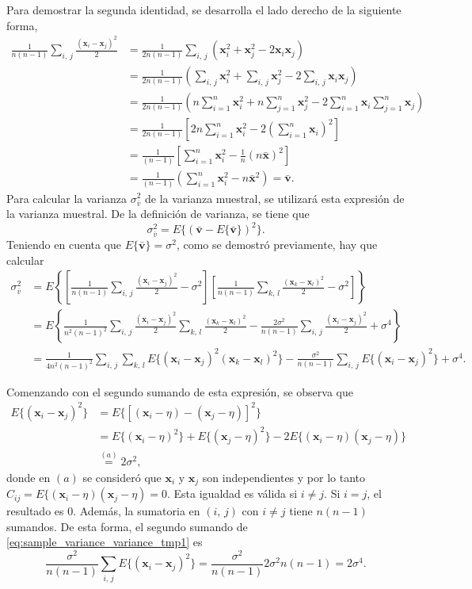 \documentclass[a4paper]{report}
\newcommand{\x}{\mathbf{x}}
\begin{document}
Para demostrar la segunda identidad, se desarrolla el lado derecho de la siguiente forma,
\begin{align*}
 \frac{1}{n(n-1)}\sum_{i,\,j}\frac{(\x_i-\x_j)^2}{2}&=\frac{1}{2n(n-1)}\sum_{i,\,j}(\x_i^2+\x_j^2-2\x_i\x_j)\\
 &=\frac{1}{2n(n-1)}\left(\sum_{i,\,j}\x_i^2+\sum_{i,\,j}\x_j^2-2\sum_{i,\,j}\x_i\x_j\right)\\
 &=\frac{1}{2n(n-1)}\left(n\sum_{i=1}^n\x_i^2+n\sum_{j=1}^n\x_j^2-2\sum_{i=1}^n\x_i\sum_{j=1}^n\x_j\right)\\
 &=\frac{1}{2n(n-1)}\left[2n\sum_{i=1}^n\x_i^2-2\left(\sum_{i=1}^n\x_i\right)^2\right]\\
 &=\frac{1}{(n-1)}\left[\sum_{i=1}^n\x_i^2-\frac{1}{n}(n\bar{\x})^2\right]\\
 &=\frac{1}{(n-1)}\left(\sum_{i=1}^n\x_i^2-n\bar{\x}^2\right)=\bar{\mathbf{v}}.
\end{align*}
Para calcular la varianza \(\sigma_{\bar{v}}^2\) de la varianza muestral, se utilizará esta expresión de la varianza muestral. De la definición de varianza, se tiene que
\[
 \sigma_{\bar{v}}^2=E\{(\bar{\mathbf{v}}-E\{\bar{\mathbf{v}}\})^2\}.
\]
Teniendo en cuenta que \(E\{\bar{\mathbf{v}}\}=\sigma^2\), como se demostró previamente, hay que calcular
\begin{align}\label{eq:sample_variance_variance_tmp1}
 \sigma_{\bar{v}}^2&=E\left\{\left[\frac{1}{n(n-1)}\sum_{i,\,j}\frac{(\x_i-\x_j)^2}{2}-\sigma^2\right]\left[\frac{1}{n(n-1)}\sum_{k,\,l}\frac{(\x_k-\x_l)^2}{2}-\sigma^2\right]\right\}\nonumber\\
   &=E\left\{\frac{1}{n^2(n-1)^2}\sum_{i,\,j}\frac{(\x_i-\x_j)^2}{2}\sum_{k,\,l}\frac{(\x_k-\x_l)^2}{2}-\frac{2\sigma^2}{n(n-1)}\sum_{i,\,j}\frac{(\x_i-\x_j)^2}{2}+\sigma^4\right\}\nonumber\\
   &=\frac{1}{4n^2(n-1)^2}\sum_{i,\,j}\sum_{k,\,l}E\{(\x_i-\x_j)^2(\x_k-\x_l)^2\}-\frac{\sigma^2}{n(n-1)}\sum_{i,\,j}E\{(\x_i-\x_j)^2\}+\sigma^4.
\end{align}

Comenzando con el segundo sumando de esta expresión, se observa que
\begin{align*}
 E\{(\x_i-\x_j)^2\}&=E\{[(\x_i-\eta)-(\x_j-\eta)]^2\}\\
  &=E\{(\x_i-\eta)^2\}+E\{(\x_j-\eta)^2\}-2E\{(\x_i-\eta)(\x_j-\eta)\}\\
  &\overset{(a)}{=}2\sigma^2,
\end{align*}
donde en \((a)\) se consideró que \(\x_i\) y \(\x_j\) son independientes y por lo tanto \(C_{ij}=E\{(\x_i-\eta)(\x_j-\eta)=0\). Esta igualdad es válida si \(i\neq j\). Si \(i=j\), el resultado es 0. Además, la sumatoria en \((i,\, j)\) con \(i\neq j\) tiene \(n(n-1)\) sumandos. De esta forma, el segundo sumando de \ref{eq:sample_variance_variance_tmp1} es
\begin{equation}\label{eq:sample_variance_variance_tmp2}
 \frac{\sigma^2}{n(n-1)}\sum_{i,\,j}E\{(\x_i-\x_j)^2\}=\frac{\sigma^2}{n(n-1)}2\sigma^2n(n-1)=2\sigma^4.
\end{equation}
\end{document}
